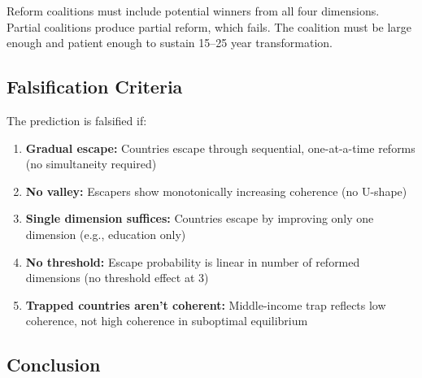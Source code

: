 \begin{tcolorbox}[colback=yellow!5!white, colframe=yellow!75!black]
Reform coalitions must include potential winners from all four dimensions. 
Partial coalitions produce partial reform, which fails. The coalition must 
be large enough and patient enough to sustain 15--25 year transformation.
\end{tcolorbox}

\subsection{Falsification Criteria}

The prediction is falsified if:

\begin{enumerate}
    \item \textbf{Gradual escape:} Countries escape through sequential, 
    one-at-a-time reforms (no simultaneity required)
    
    \item \textbf{No valley:} Escapers show monotonically increasing coherence 
    (no U-shape)
    
    \item \textbf{Single dimension suffices:} Countries escape by improving 
    only one dimension (e.g., education only)
    
    \item \textbf{No threshold:} Escape probability is linear in number of 
    reformed dimensions (no threshold effect at 3)
    
    \item \textbf{Trapped countries aren't coherent:} Middle-income trap 
    reflects low coherence, not high coherence in suboptimal equilibrium
\end{enumerate}

\subsection{Conclusion}

